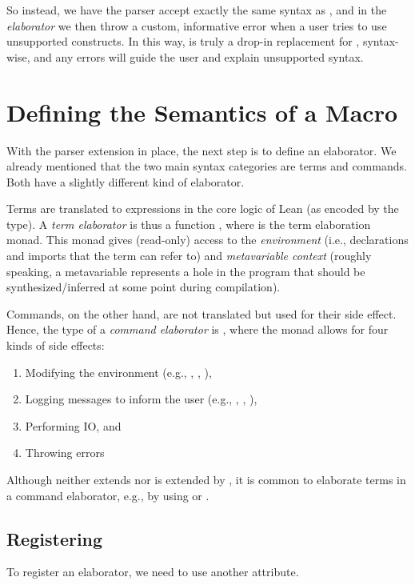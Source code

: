 So instead, we have the parser accept exactly the same syntax as \inductive{}, and in the \emph{elaborator} we then throw a custom, informative error when a user tries to use unsupported constructs.
In this way, \data{} is truly a drop-in replacement for \inductive{}, syntax-wise, and any errors will guide the user and explain unsupported syntax.



\section{Defining the Semantics of a Macro}
With the parser extension in place, the next step is to define an elaborator.
We already mentioned that the two main syntax categories are terms and commands.
Both have a slightly different kind of elaborator.

Terms are translated to expressions in the core logic of Lean (as encoded by the  type). A \emph{term elaborator} is thus a function , where  is the term elaboration monad. This monad gives (read-only) access to the \emph{environment} (i.e., declarations and imports that the term can refer to) and \emph{metavariable context} (roughly speaking, a metavariable represents a hole in the program that should be synthesized/inferred at some point during compilation).


Commands, on the other hand, are not translated but used for their side effect. Hence, the type of a \emph{command elaborator} is , where the  monad allows for four kinds of side effects: 
\begin{enumerate}
    \item Modifying the environment (e.g., \inductive{}, , ),
    \item Logging messages to inform the user (e.g., , , ),
    \item Performing IO, and
    \item Throwing errors
\end{enumerate}

Although  neither extends nor is extended by , it is common to elaborate terms in a command elaborator, e.g., by using  or .


\subsection*{Registering}
To register an elaborator, we need to use another attribute.

